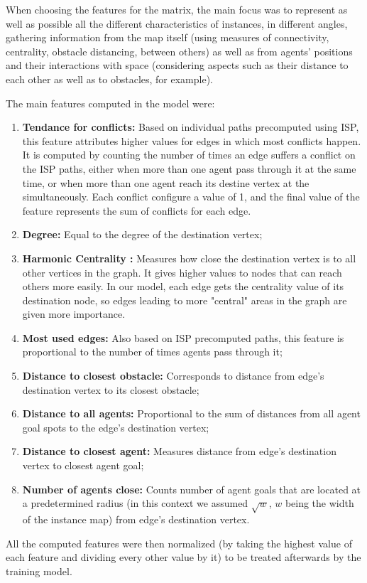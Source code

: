 When choosing the features for the matrix, the main focus was to represent as well as possible all the different characteristics of instances, in different angles, gathering information from the map itself (using measures of connectivity, centrality, obstacle distancing, between others) as well as from agents' positions and their interactions with space (considering aspects such as their distance to each other as well as to obstacles, for example).

The main features computed in the model were:
\begin{enumerate}
    \item \textbf{Tendance for conflicts:} Based on individual paths precomputed using ISP, this feature attributes higher values for edges in which most conflicts happen. It is computed by counting the number of times an edge suffers a conflict on the ISP paths, either when more than one agent pass through it at the same time, or when more than one agent reach its destine vertex at the simultaneously. Each conflict configure a value of 1, and the final value of the feature represents the sum of conflicts for each edge.
    \item \textbf{Degree:} Equal to the degree of the destination vertex;
    \item \textbf{Harmonic Centrality \cite{Centrality2025}:} Measures how close the destination vertex is to all other vertices in the graph. It gives higher values to nodes that can reach others more easily. In our model, each edge gets the centrality value of its destination node, so edges leading to more "central" areas in the graph are given more importance.
    \item \textbf{Most used edges:} Also based on ISP precomputed paths, this feature is proportional to the number of times agents pass through it;
    \item \textbf{Distance to closest obstacle:} Corresponds to distance from edge's destination vertex to its closest obstacle;
    \item \textbf{Distance to all agents:} Proportional to the sum of distances from all agent goal spots to the edge's destination vertex;
    \item \textbf{Distance to closest agent:} Measures distance from edge's destination vertex to closest agent goal;
    \item \textbf{Number of agents close:} Counts number of agent goals that are located at a predetermined radius (in this context we assumed $\sqrt{w}$, $w$ being the width of the instance map) from edge's destination vertex.
\end{enumerate}
All the computed features were then normalized (by taking the highest value of each feature and dividing every other value by it) to be treated afterwards by the training model.

